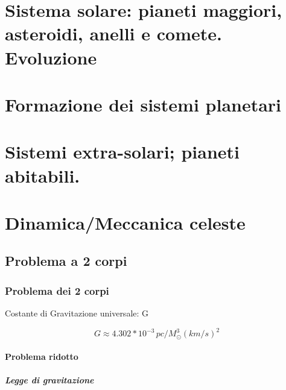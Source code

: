 \part{Sistema solare: pianeti maggiori, asteroidi, anelli e comete. Evoluzione}
\frame{\partpage}



\part{Formazione dei sistemi planetari}
\frame{\partpage}



\part{Sistemi extra-solari; pianeti abitabili.}
\frame{\partpage}




\part{Dinamica/Meccanica celeste}

\chapter{Problema a 2 corpi}
\PartialToc

\section{Problema dei 2 corpi}



\begin{usefull}{Costante di Gravitazione universale: G}

\begin{equation*}
G\approx4.302*10^{-3}\,pc/M_{\odot}^{3}(km/s)^2
\end{equation*}

\end{usefull}

\subsection{Problema ridotto}


\subsubsection{Legge di gravitazione}

